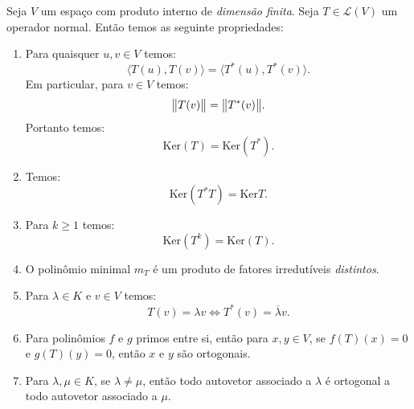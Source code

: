 \documentclass[11pt,twoside,a4paper]{book}
\begin{document}
\begin{teorema}\label{normal}
Seja $V$ um espaço com produto interno de \emph{dimensão finita}. Seja $T\in\mathcal{L}(V)$ um operador normal. Então temos as seguinte propriedades:
\begin{enumerate}
\item Para quaisquer $u,v\in V$ temos:
\[
\langle T(u),T(v)\rangle=\langle T^*(u),T^*(v)\rangle.
\]
Em particular, para $v\in V$ temos:
\[
\norm{T(v)}=\norm{T^*(v)}.
\]
Portanto temos:
\[
\mathrm{Ker}(T)=\mathrm{Ker}(T^*).
\]
\item Temos:
\[
\mathrm{Ker}(T^*T)=\mathrm{Ker}{T}.
\]
\item Para $k\geq 1$ temos:
\[
\mathrm{Ker}(T^k)=\mathrm{Ker}(T).
\]
\item O polinômio minimal $m_T$ é um produto de fatores irredutíveis \emph{distintos}.
\item Para $\lambda\in K$ e $v\in V$ temos:
\[
T(v)=\lambda v\Leftrightarrow T^*(v)=\overline{\lambda}v.
\]
\item Para polinômios $f$ e $g$ primos entre si, então para $x,y\in V$, se $f(T)(x)=0$ e $g(T)(y)=0$, então $x$ e $y$ são ortogonais.
\item Para $\lambda,\mu\in K$, se $\lambda\neq\mu$, então todo autovetor associado a $\lambda$ é ortogonal a todo autovetor associado a $\mu.$
\end{enumerate}
\end{teorema}
\end{document}
